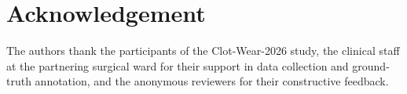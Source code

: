 \documentclass[conference]{IEEEtran}
\begin{document}
\begin{table}[h]
\caption{Implementation Roadmap (Phase 1--3)}
\label{tab:roadmap}
\centering
{}
\end{table}

\section*{Acknowledgement}
The authors thank the participants of the Clot-Wear-2026 study, the
clinical staff at the partnering surgical ward for their support in
data collection and ground-truth annotation, and the anonymous
reviewers for their constructive feedback.
\end{document}
